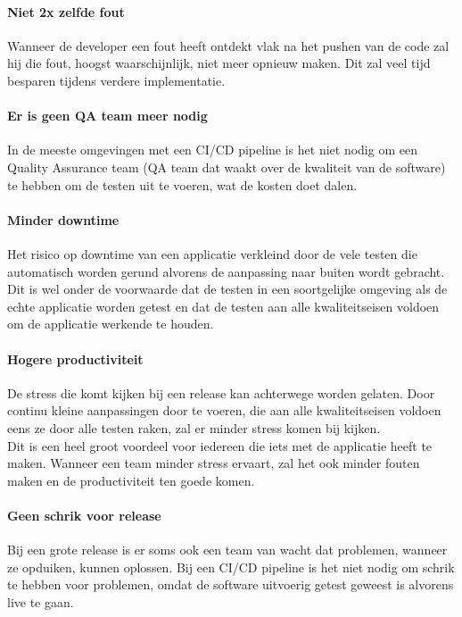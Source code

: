         \paragraph[Niet 2x zelfde fout]{Niet 2x zelfde fout}
            Wanneer de developer een fout heeft ontdekt vlak na het pushen van de code zal hij die fout, hoogst waarschijnlijk, niet meer opnieuw maken. Dit zal veel tijd besparen tijdens verdere implementatie.
        
        \paragraph[Geen QA team]{Er is geen QA team meer nodig}
            In de meeste omgevingen met een CI/CD pipeline is het niet nodig om een Quality Assurance team (QA team dat waakt over de kwaliteit van de software) te hebben om de testen uit te voeren, wat de kosten doet dalen.
        
        \paragraph[Minder downtime]{Minder downtime}
            Het risico op downtime van een applicatie verkleind door de vele testen die automatisch worden gerund alvorens de aanpassing naar buiten wordt gebracht. Dit is wel onder de voorwaarde dat de testen in een soortgelijke omgeving als de echte applicatie worden getest en dat de testen aan alle kwaliteitseisen voldoen om de applicatie werkende te houden.
        
        \paragraph[Hogere productiviteit]{Hogere productiviteit}
            De stress die komt kijken bij een release kan achterwege worden gelaten. Door continu kleine aanpassingen door te voeren, die aan alle kwaliteitseisen voldoen eens ze door alle testen raken, zal er minder stress komen bij kijken.\\
            Dit is een heel groot voordeel voor iedereen die iets met de applicatie heeft te maken. Wanneer een team minder stress ervaart, zal het ook minder fouten maken en de productiviteit ten goede komen.
        \paragraph[Geen schrik voor release]{Geen schrik voor release}
            Bij een grote release is er soms ook een team van wacht dat problemen, wanneer ze opduiken, kunnen oplossen. Bij een CI/CD pipeline is het niet nodig om schrik te hebben voor problemen, omdat de software uitvoerig getest geweest is alvorens live te gaan.
    
